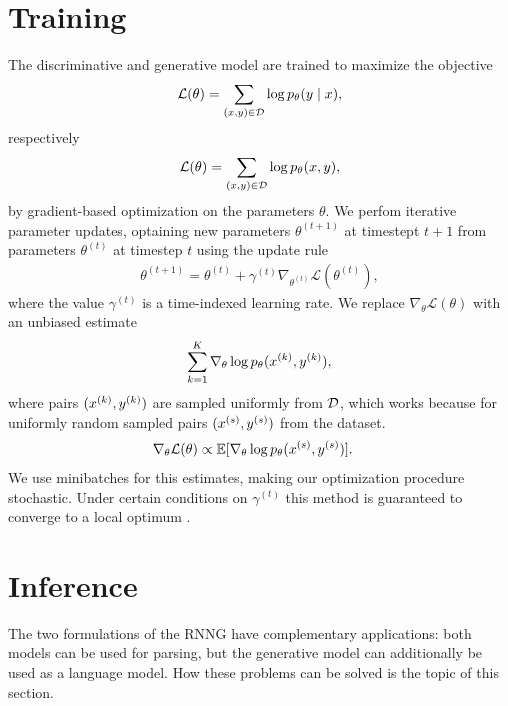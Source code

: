 \section{Training}
  The discriminative and generative model are trained to maximize the objective
  \begin{align*}
    \mathcal{L}(\theta) = \sum_{(x, y) \in \mathcal{D}} \log p_{\theta} (y \mid x),
  \end{align*}
  respectively
  \begin{align*}
    \mathcal{L}(\theta) = \sum_{(x, y) \in \mathcal{D}} \log p_{\theta} (x, y),
  \end{align*}
  by gradient-based optimization on the parameters $\theta$. We perfom iterative parameter updates, optaining new parameters $\theta^{(t+1)}$ at timestept $t+1$ from parameters $\theta^{(t)}$ at timestep $t$ using the update rule
  \begin{align*}
    \theta^{(t+1)} = \theta^{(t)} + \gamma^{(t)} \nabla_{\theta^{(t)}} \mathcal{L}( \theta^{(t)} ),
  \end{align*}
  where the value $\gamma^{(t)}$ is a time-indexed learning rate. We replace $\nabla_{\theta} \mathcal{L}(\theta)$ with an unbiased estimate
  \begin{align*}
    \sum_{k=1}^{K} \nabla_{\theta} \log p_{\theta} (x^{(k)}, y^{(k)}),
  \end{align*}
  where pairs $(x^{(k)}, y^{(k)})$ are sampled uniformly from $\mathcal{D}$, which works because for uniformly random sampled pairs $(x^{(s)}, y^{(s)})$ from the dataset.
  \begin{align*}
    \nabla_{\theta} \mathcal{L}(\theta)
      &\propto \operatorname{\mathbb{E}} [ \nabla_{\theta} \log p_{\theta} (x^{(s)}, y^{(s)}) ].
  \end{align*}
  We use minibatches for this estimates, making our optimization procedure stochastic. Under certain conditions on $\gamma^{(t)}$ this method is guaranteed to converge to a local optimum \citep{robbins1951stochastic}.


\section{Inference}
  The two formulations of the RNNG have complementary applications: both models can be used for parsing, but the generative model can additionally be used as a language model. How these problems can be solved is the topic of this section.


